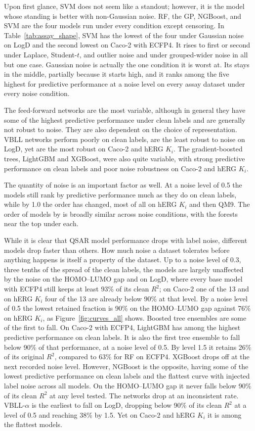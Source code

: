 Upon first glance, SVM does not seem like a standout; however, it is the model whose standing is better with non-Gaussian noise. RF, the GP, NGBoost, and SVM are the four models run under every condition except censoring. In Table~\ref{tab:assay_shape}, SVM has the lowest \aucnorm{} of the four under Gaussian noise on LogD and the second lowest on Caco-2 with ECFP4. It rises to first or second under Laplace, Student-$t$, and outlier noise and under grouped-wider noise in all but one case. Gaussian noise is actually the one condition it is worst at. Its \aucnorm{} stays in the middle, partially because it starts high, and it ranks among the five highest for predictive performance at a noise level on every assay dataset under every noise condition.

The feed-forward networks are the most variable, although in general they have some of the highest predictive performance under clean labels and are generally not robust to noise. They are also dependent on the choice of representation. VBLL networks perform poorly on clean labels, are the least robust to noise on LogD, yet are the most robust on Caco-2 and hERG $K_i$. The gradient-boosted trees, LightGBM and XGBoost, were also quite variable, with strong predictive performance on clean labels and poor noise robustness on Caco-2 and hERG $K_i$.

The quantity of noise is an important factor as well. At a noise level of 0.5 the models still rank by predictive performance much as they do on clean labels, while by 1.0 the order has changed, most of all on hERG $K_i$ and then QM9. The order of models by \aucnorm{} is broadly similar across noise conditions, with the forests near the top under each.

While it is clear that QSAR model performance drops with label noise, different models drop faster than others. How much noise a dataset tolerates before anything happens is itself a property of the dataset. Up to a noise level of 0.3, three tenths of the spread of the clean labels, the models are largely unaffected by the noise on the HOMO--LUMO gap and on LogD, where every base model with ECFP4 still keeps at least 93\% of its clean $R^2$; on Caco-2 one of the 13 and on hERG $K_i$ four of the 13 are already below 90\% at that level. By a noise level of 0.5 the lowest retained fraction is 90\% on the HOMO--LUMO gap against 76\% on hERG $K_i$, as Figure~\ref{fig:curves_all} shows. Boosted tree ensembles are some of the first to fall. On Caco-2 with ECFP4, LightGBM has among the highest predictive performance on clean labels. It is also the first tree ensemble to fall below 90\% of that performance, at a noise level of 0.5. By level 1.5 it retains 26\% of its original $R^2$, compared to 63\% for RF on ECFP4. XGBoost drops off at the next recorded noise level. However, NGBoost is the opposite, having some of the lowest predictive performance on clean labels and the flattest curve with injected label noise across all models. On the HOMO--LUMO gap it never falls below 90\% of its clean $R^2$ at any level tested. The networks drop at an inconsistent rate. VBLL-$\alpha$ is the earliest to fall on LogD, dropping below 90\% of its clean $R^2$ at a level of 0.5 and reaching 38\% by 1.5. Yet on Caco-2 and hERG $K_i$ it is among the flattest models.

